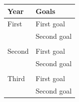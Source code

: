 \documentclass[a4,useAMS,usenatbib,usegraphicx,12pt]{article}
\begin{document}
\begin{table}[h]
\begin{flushleft}
\begin{center}
  \begin{tabular}{l  l} \hline\hline
	\centering\textbf{Year} & \textbf{Goals} \\ \hline
	First  
	& \tabitem First goal \\
	& \tabitem Second goal\\
	
	\\
	Second
	& \tabitem First goal \\
	& \tabitem Second goal\\

	\\	
	Third
	& \tabitem First goal \\
	& \tabitem Second goal\\ 
	
	\hline\hline
  \end{tabular}  
\end{center}
\end{flushleft}
\end{table}



\renewcommand{\bibname}{8\ \ \ \ Bibliography}

\end{document}
